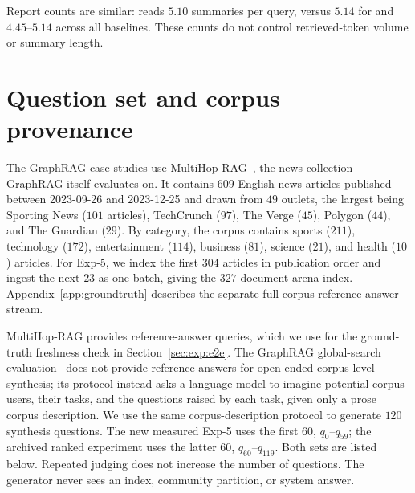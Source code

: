 Report counts are similar: \DyLo{} reads $5.10$ summaries per query,
versus $5.14$ for \QCA{} and $4.45$--$5.14$ across all baselines.
These counts do not control retrieved-token volume or summary length.

\section{Question set and corpus provenance}
\label{app:questions}

 The GraphRAG case studies use MultiHop-RAG~\cite{tang2024multihoprag},
the news collection GraphRAG itself evaluates on. It contains $609$ English news
articles published between 2023-09-26 and 2023-12-25 and drawn from $49$ outlets,
the largest being Sporting News ($101$ articles), TechCrunch ($97$), The Verge
($45$), Polygon ($44$), and The Guardian ($29$). By category, the corpus contains
sports ($211$), technology ($172$), entertainment ($114$), business ($81$),
science ($21$), and health ($10$) articles. For Exp-5, we index the first $304$ articles in
publication order and ingest the next $23$ as one batch, giving the $327$-document
arena index. Appendix~\ref{app:groundtruth} describes the separate full-corpus
reference-answer stream.

 MultiHop-RAG provides reference-answer queries,
which we use for the ground-truth freshness check in
Section~\ref{sec:exp:e2e}. The GraphRAG global-search evaluation~\cite{edge2024graphrag} does not
provide reference answers for open-ended corpus-level synthesis; its protocol
instead asks a language model to imagine potential corpus users, their tasks,
and the questions raised by each task, given only a prose corpus description.
We use the same corpus-description protocol to generate $120$ synthesis
questions. The new measured Exp-5 uses the first $60$, $q_0$--$q_{59}$;
the archived ranked experiment uses the latter $60$, $q_{60}$--$q_{119}$.
Both sets are listed below. Repeated judging does not increase the number of
questions. The generator never
sees an index, community partition, or system answer.

